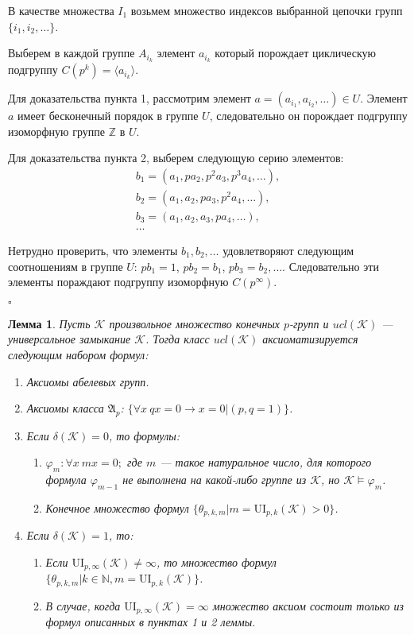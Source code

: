 \documentclass[a4paper,11pt,twoside]{article}
\newtheorem{lemma}{Лемма}[section]
\def\A{{\mathfrak{A}}}
\def\K{{\mathcal{K}}}
\def\Z{{\mathbb{Z}}}
\def\N{{\mathbb{N}}}
\def\ui{{\mathrm{UI}}}
\begin{document}
В качестве множества $I_1$ возьмем множество индексов выбранной цепочки групп $\{i_1, i_2, \ldots\}$.

Выберем в каждой группе $A_{i_k}$ элемент $a_{i_k}$ который порождает циклическую подгруппу $C(p^k) = \langle a_{i_k}\rangle$.

Для доказательства пункта 1, рассмотрим элемент $a = (a_{i_1}, a_{i_2}, \ldots) \in U$. Элемент $a$ имеет бесконечный порядок в группе $U$, следовательно он порождает подгруппу изоморфную группе $\Z$ в $U$. 

Для доказательства пункта 2, выберем следующую серию элементов:
$$\begin{array}{l}
b_1 = (a_1, p a_2, p^2 a_3, p^3 a_4, \ldots), \\
b_2 = (a_1, a_2, p a_3, p^2 a_4, \ldots), \\
b_3 = (a_1, a_2, a_3, p a_4, \ldots), \\
\ldots
\end{array}$$

Нетрудно проверить, что элементы $b_1, b_2, \ldots$ удовлетворяют следующим соотношениям в группе $U$: $pb_1 = 1$, $pb_2 = b_1$, $pb_3 = b_2, \ldots$. Следовательно эти элементы пораждают подгруппу изоморфную $C(p^\infty)$.

$\square$


\begin{lemma}
Пусть $\K$ произвольное множество конечных $p$-групп и $ucl(\K)$ --- универсальное замыкание $\K$. Тогда класс $ucl(\K)$ аксиоматизируется следующим набором формул:
\begin{enumerate}
\item Аксиомы абелевых групп.
\item Аксиомы класса $\A_p$: $\{ \forall x \ qx = 0 \rightarrow x = 0 | (p,q = 1) \}$.
\item Если $\delta(\K) = 0$, то формулы:
\begin{enumerate}
\item $\varphi_m: \forall x \ mx = 0;$ где $m$ --- такое натуральное число, для которого формула $\varphi_{m-1}$ не выполнена на какой-либо группе из $\K$, но $\K \models \varphi_m$. 
\item Конечное множество формул $\{\theta_{p,k,m} |  m = \ui_{p,k}(\K) > 0 \}$.
\end{enumerate}
\item Если $\delta(\K) = 1$, то:
\begin{enumerate}
\item Если $\ui_{p, \infty}(\K) \neq \infty$, то множество формул $\{ \theta_{p,k,m} | k \in \N, m = \ui_{p,k}(\K)\}$.
\item В случае, когда $\ui_{p, \infty}(\K) = \infty$ множество аксиом состоит только из формул описанных в пунктах 1 и 2 леммы.
\end{enumerate}
\end{enumerate}
\end{lemma}
\end{document}
